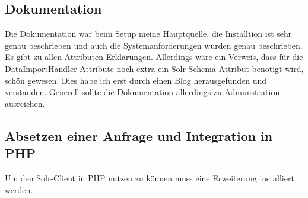 \subsection{Dokumentation}

Die Dokumentation war beim Setup meine Hauptquelle, die Installtion ist sehr genau beschrieben und auch die Systemanforderungen wurden genau beschrieben. Es gibt zu allen Attributen Erklärungen. Allerdings wäre ein Verweis, dass für die DataImportHandler-Attribute noch extra ein Solr-Schema-Attribut benötigt wird, schön gewesen. Dies habe ich erst durch einen Blog \cite{IqubalMustafaKaki.2016} herausgefunden und verstanden. Generell sollte die Dokumentation allerdings zu Administration ausreichen. 

\subsection{Absetzen einer Anfrage und Integration in PHP}

Um den Solr-Client in PHP nutzen zu können muss eine Erweiterung installiert werden. \cite{ThePHPGroup.2019}